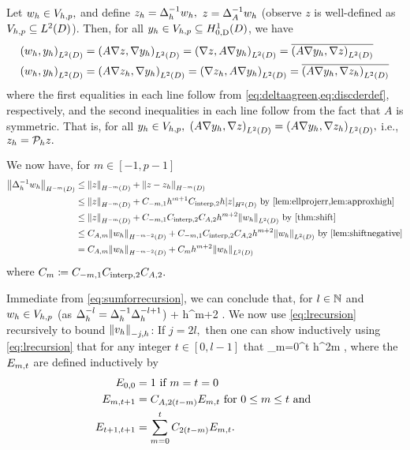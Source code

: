 Let $w_{h} \in V_{h,p},$ and define $z_{h} = \Delta_{h}^{-1} w_{h},$ $z = \Delta_{A}^{-1} w_{h}$ (observe $z$ is well-defined as $\Vhp \subseteq \LtD$). Then, for all $\yh \in \Vhp \subseteq \HozDD$, we have
\begin{align*}
\IPLtD{\wh}{\yh} &= \IPLtD{A \grad z}{\grad \yh} = \IPLtD{\grad z}{A\grad \yh} = \overline{\IPLtD{A\grad \yh}{\grad z}} \\
\IPLtD{\wh}{\yh} &= \IPLtD{A \grad \zh}{\grad \yh} = \IPLtD{\grad \zh}{A\grad \yh} = \overline{\IPLtD{A\grad \yh}{\grad \zh}}
\end{align*}
where the first equalities in each line follow from \cref{eq:deltaagreen,eq:discderdef}, respectively, and the second inequalities in each line follow from the fact that $A$ is symmetric. That is, for all $y_{h} \in V_{h,p},$ $\IPLtD{A\grad \yh}{\grad z} = \IPLtD{A\grad \yh}{\grad \zh},$ i.e., $z_{h} = \mathcal P_{h} z.$

We now have, for $m \in [-1,p-1]$
\begin{align}
\NHmmD{\DeltahI \wh} &\leq \NHmmD{z} + \NHmmD{z-\zh}\nonumber\\
&\leq \NHmmD{z} + \Cmmo h^{m+1} \Cinterpt h \SNHtD{z} \text{ by \cref{lem:ellprojerr,lem:approxhigh}}\nonumber\\
&\leq \NHmmD{z} + \Cmmo \Cinterpt \CAt h^{m+2} \NLtD{\wh} \text{ by \cref{thm:shift}}\nonumber\\
&\leq \CAm \NHmmmtD{\wh} + \Cmmo \Cinterpt \CAt h^{m+2} \NLtD{\wh} \text{ by \cref{lem:shiftnegative}}\nonumber\\
&= \CAm \NHmmmtD{\wh} + \Cm h^{m+2} \NLtD{\wh}\label{eq:sumforrecursion}
\end{align}
where $C_{m} \coloneqq C_{-m,1} C_{\mathrm{interp},2} C_{A,2}.$

Immediate from \cref{eq:sumforrecursion}, we can conclude that, for $l \in \mathbb N$ and $w_{h} \in V_{h,p}$ (as $\Delta_{h}^{-l} = \Delta_{h}^{-1} \Delta_{h}^{-l+1}$)
\beq\label{eq:lrecursion}
\NHmmD{\Deltahml \vh} \leq \CAm \NHmmmtD{\Deltahmlpo \vh} + \Cm h^{m+2} \NLtD{\Deltahmlpo \vh}.
\eeq
We now use \cref{eq:lrecursion} recursively to bound $\Nmjh{\vh}$:
If $j = 2l,$ then one can show inductively using \cref{eq:lrecursion} that for any integer $t \in [0,l-1]$ that
\beq\label{eq:evenrecursivesum}
 \leq \sum_{m=0}^t h^{2m}  ,
\eeq
where the $E_{m,t}$ are defined inductively by
\begin{align}
\label{eq:Emt1}E_{0,0} &= 1 \text{ if } m=t=0\\
\label{eq:Emt2}E_{m,t+1} &= C_{A,2(t-m)} E_{m,t} \text{ for } 0 \leq m \leq t \text{ and }\\
\label{eq:Emt3}E_{t+1,t+1} &= \sum_{m=0}^t C_{2(t-m)} E_{m,t}.
\end{align}

